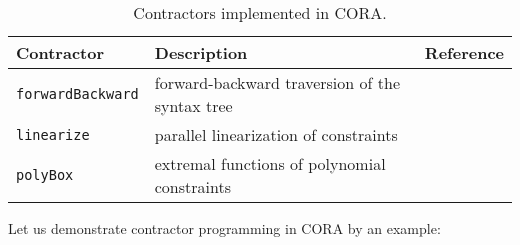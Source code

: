 \begin{table}
\centering
\caption{Contractors implemented in CORA.}
\label{tab:contractors}
\begin{tabular}{ l l l}	
\toprule
\textbf{Contractor} & \textbf{Description} & \textbf{Reference} \\
\midrule
\texttt{forwardBackward} & forward-backward traversion of the syntax tree & \cite[Chapter~4.2.4]{Jaulin2006}\\
\texttt{linearize} & parallel linearization of constraints & \cite[Chapter~4.3.4]{Jaulin2006}\\
\texttt{polyBox} & extremal functions of polynomial constraints & \cite{Trombettoni2010} \\
\bottomrule
\end{tabular}
\end{table}

Let us demonstrate contractor programming in CORA by an example:
\begin{center}
\begin{minipage}[t]{0.55\textwidth}
	\vspace{10pt}
	\footnotesize
	
\end{minipage}
\begin{minipage}[t]{0.3\textwidth}
	\vspace{0pt}
	\centering
\end{minipage}
\end{center}
